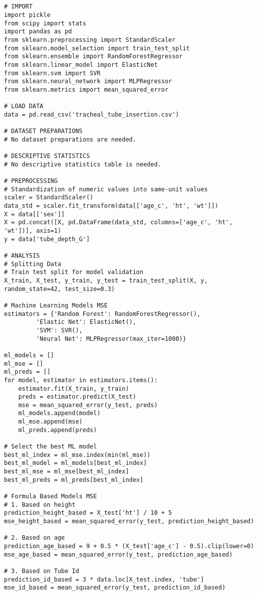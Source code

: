 \documentclass[11pt]{article}
\begin{document}
\begin{verbatim}


# IMPORT
import pickle
from scipy import stats
import pandas as pd
from sklearn.preprocessing import StandardScaler
from sklearn.model_selection import train_test_split
from sklearn.ensemble import RandomForestRegressor
from sklearn.linear_model import ElasticNet
from sklearn.svm import SVR
from sklearn.neural_network import MLPRegressor
from sklearn.metrics import mean_squared_error

# LOAD DATA
data = pd.read_csv('tracheal_tube_insertion.csv')

# DATASET PREPARATIONS
# No dataset preparations are needed.

# DESCRIPTIVE STATISTICS
# No descriptive statistics table is needed.

# PREPROCESSING 
# Standardization of numeric values into same-unit values
scaler = StandardScaler()
data_std = scaler.fit_transform(data[['age_c', 'ht', 'wt']])
X = data[['sex']]
X = pd.concat([X, pd.DataFrame(data_std, columns=['age_c', 'ht', 'wt'])], axis=1)
y = data['tube_depth_G']

# ANALYSIS
# Splitting Data 
# Train test split for model validation
X_train, X_test, y_train, y_test = train_test_split(X, y, random_state=42, test_size=0.3)

# Machine Learning Models MSE
estimators = {'Random Forest': RandomForestRegressor(), 
         'Elastic Net': ElasticNet(), 
         'SVM': SVR(), 
         'Neural Net': MLPRegressor(max_iter=1000)}

ml_models = []
ml_mse = []
ml_preds = []
for model, estimator in estimators.items():
    estimator.fit(X_train, y_train)
    preds = estimator.predict(X_test)
    mse = mean_squared_error(y_test, preds)
    ml_models.append(model)
    ml_mse.append(mse)
    ml_preds.append(preds)

# Select the best ML model
best_ml_index = ml_mse.index(min(ml_mse))
best_ml_model = ml_models[best_ml_index]
best_ml_mse = ml_mse[best_ml_index]
best_ml_preds = ml_preds[best_ml_index]

# Formula Based Models MSE
# 1. Based on height
prediction_height_based = X_test['ht'] / 10 + 5
mse_height_based = mean_squared_error(y_test, prediction_height_based)

# 2. Based on age
prediction_age_based = 9 + 0.5 * (X_test['age_c'] - 0.5).clip(lower=0)
mse_age_based = mean_squared_error(y_test, prediction_age_based)

# 3. Based on Tube Id
prediction_id_based = 3 * data.loc[X_test.index, 'tube']
mse_id_based = mean_squared_error(y_test, prediction_id_based)


\end{verbatim}
\end{document}
